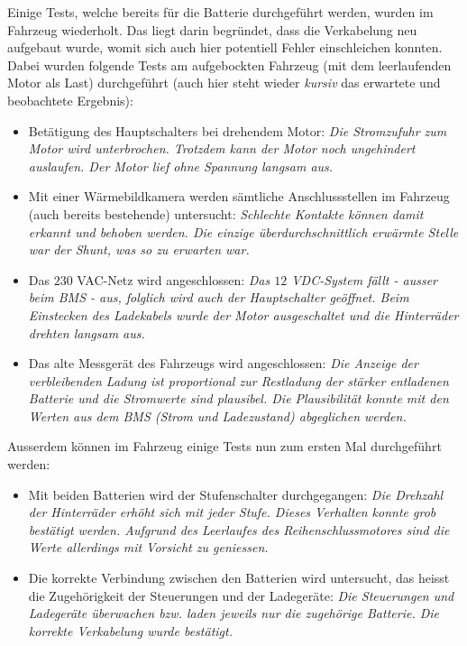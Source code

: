 \color{blue} Einige Tests, welche bereits für die Batterie durchgeführt werden, wurden im Fahrzeug wiederholt. Das liegt darin begründet, dass die Verkabelung neu aufgebaut wurde, womit sich auch hier potentiell Fehler einschleichen konnten. Dabei wurden folgende Tests am aufgebockten Fahrzeug (mit dem leerlaufenden Motor als Last) durchgeführt (auch hier steht wieder \textit{kursiv} das erwartete und beobachtete Ergebnis): \begin{itemize}
	\item Betätigung des Hauptschalters bei drehendem Motor: \textit{Die Stromzufuhr zum Motor wird unterbrochen. Trotzdem kann der Motor noch ungehindert auslaufen. Der Motor lief ohne Spannung langsam aus.}
	\item Mit einer Wärmebildkamera werden sämtliche Anschlussstellen im Fahrzeug (auch bereits bestehende) untersucht: \textit{Schlechte Kontakte können damit erkannt und behoben werden. Die einzige überdurchschnittlich erwärmte Stelle war der Shunt, was so zu erwarten war.}
	\item Das $230$ VAC-Netz wird angeschlossen: \textit{Das $12$ VDC-System fällt - ausser beim BMS - aus, folglich wird auch der Hauptschalter geöffnet. Beim Einstecken des Ladekabels wurde der Motor ausgeschaltet und die Hinterräder drehten langsam aus.}
	\item Das alte Messgerät des Fahrzeugs wird angeschlossen: \textit{Die Anzeige der verbleibenden Ladung ist proportional zur Restladung der stärker entladenen Batterie und die Stromwerte sind plausibel. Die Plausibilität konnte mit den Werten aus dem BMS (Strom und Ladezustand) abgeglichen werden.}
\end{itemize}

Ausserdem können im Fahrzeug einige Tests nun zum ersten Mal durchgeführt werden: \begin{itemize}
	\item Mit beiden Batterien wird der Stufenschalter durchgegangen: \textit{Die Drehzahl der Hinterräder erhöht sich mit jeder Stufe. Dieses Verhalten konnte grob bestätigt werden. Aufgrund des Leerlaufes des Reihenschlussmotores sind die Werte allerdings mit Vorsicht zu geniessen.}
	\item Die korrekte Verbindung zwischen den Batterien wird untersucht, das heisst die Zugehörigkeit der Steuerungen und der Ladegeräte: \textit{Die Steuerungen und Ladegeräte überwachen bzw. laden jeweils nur die zugehörige Batterie. Die korrekte Verkabelung wurde bestätigt.}
\end{itemize}

